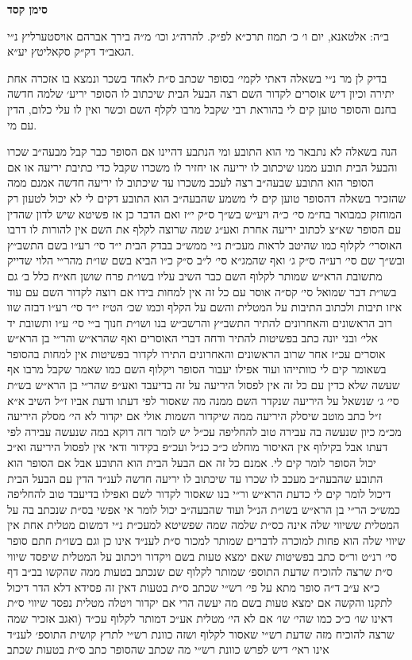 \documentclass[12pt, openany]{book}
\newcommand{\chapname}{}
\newcommand{\newchap}[1]{
	\addcontentsline{toc}{chapter}{#1}
	\renewcommand{\chapname}{#1}
		\begin{center}
			\textbf{%
\fontsize{16pt}{16pt}\selectfont
				#1}
		\end{center}
}
\begin{document}
\newchap{סימן קסד}
\begin{multicols}{2}
ב״ה: אלטאנא, יום ו׳ כ׳ תמוז תרכ״א לפ״ק. להרה״ג וכו׳ מ״ה בירך אברהם אויסטערליץ נ״י הגאב״ד דק״ק סקאליטץ יע״א.\\\vspace{0pt}

בדיק לן מר נ״י בשאלה דאתי לקמי׳ בסופר שכתב ס״ת לאחד בשכר ונמצא בו אזכרה אחת יתירה וכיון דיש אוסרים לקדור השם רצה הבעל הבית שיכתוב לו הסופר יריע׳ שלמה חדשה בחנם והסופר טוען קים לי בהוראת רבי שקבל מרבו לקלף השם וכשר ואין לו עלי כלום, הדין עם מי.\\\vspace{0pt}

הנה בשאלה לא נתבאר מי הוא התובע ומי הנתבע דהיינו אם הסופר כבר קבל מבעה״ב שכרו והבעל הבית תובע ממנו שיכתוב לו יריעה או יחזיר לו משכרו שקבל כדי כתיבת יריעה או אם הסופר הוא התובע שבעה״ב רצה לעכב משכרו עד שיכתוב לו יריעה חדשה אמנם ממה שהזכיר בשאלה דהסופר טוען קים לי משמע שהבעה״ב הוא התובע דקים לי לא יכול לטעון רק המוחזק כמבואר בח״מ סי׳ כ״ה ויע״ש בש״ך ס״ק י״ז ואם הדבר כן אז פשיטא שיש לדון שהדין עם הסופר שא״צ לכתוב יריעה אחרת ואע״ג שמה שרוצה לקלף את השם אין להורות לו דרבו האוסרי׳ לקלוף כמו שהיטב לראות מעכ״ת נ״י ממש״כ בבדק הבית י״ד סי׳ רע״ו בשם התשב״ץ ובש״ך שם סי׳ רע״ה ס״ק ג׳ ואף שהמג״א סי׳ ל״ב ס״ק כ״ו הביא בשם שו״ת מהר״י הלוי שדייק מתשובת הרא״ש שמותר לקלוף השם כבר השיב עליו בשו״ת פרח שושן חא״ח כלל ב׳ גם בשו״ת דבר שמואל סי׳ קס״ה אוסר עם כל זה אין למחות בידו אם רוצה לקדור השם עם עוד איזו תיבות ולכתוב התיבות על המטלית והשם על הקלף וכמו שכ׳ הט״ז י״ד סי׳ רע״ו דבזה שוו רוב הראשונים והאחרונים להתיר התשב״ץ והרשב״ש בנו ושו״ת חנוך ב״י סי׳ ע״ו ותשובת יד אלי׳ ובני יונה כתב בפשיטות להתיר ודחה דברי האוסרים ואף שהרא״ש והר״י בן הרא״ש אוסרים עכ״ז אחר שרוב הראשונים והאחרונים התירו לקדור בפשיטות אין למחות בהסופר בשאומר קים לי כוותייהו ועוד אפילו יעבור הסופר ויקלוף השם כמו שאמר שקבל מרבו אף שעשה שלא כדין עם כל זה אין לפסול היריעה על זה בדיעבד ואע״פ שהר״י בן הרא״ש בש״ת סי׳ ג׳ שנשאל על היריעה שנקדר השם ממנה מה שאסור לפי דעתו ודעת אביו ז״ל השיב א״א ז״ל כתב מוטב שיסלק היריעה ממה שיקדור השמות אולי אם יקדור לא הי׳ מסלק היריעה מכ״מ כיון שנעשה בה עבירה טוב להחליפה עכ״ל יש לומר דזה דוקא במה שנעשה עבירה לפי דעתו אבל בקילוף אין האיסור מוחלט כ״כ כנ״ל ועכ״פ בקידור ודאי אין לפסול היריעה וא״כ יכול הסופר לומר קים לי. אמנם כל זה אם הבעל הבית הוא התובע אבל אם הסופר הוא התובע שהבעה״ב מעכב לו שכרו עד שיכתוב לו יריעה חדשה לענ״ד הדין עם הבעל הבית דיכול לומר קים לי כדעת הרא״ש ור״י בנו שאסור לקדור לשם ואפילו בדיעבד טוב להחליפה כמש״כ הר״י בן הרא״ש בשו״ת הנ״ל ועוד שהבעה״ב יכול לומר אי אפשי בס״ת שנכתב בה על המטלית ששיווי שלה אינה כס״ת שלמה שמה שפשיטא למעכ״ת נ״י דמשום מטלית אחת אין שיווי שלה הוא פחות למוכרה לדברים שמותר למכור ס״ת לענ״ד אינו כן וגם בשו״ת חתם סופר סי׳ רנ״ט ור״ס כתב בפשיטות שאם ימצא טעות בשם ויקדור ויכתוב על המטלית שיפסד שיווי ס״ת שרצה להוכיח שדעת התוספ׳ שמותר לקלוף שם שנכתב בטעות ממה שהקשו בב״ב דף כ״א ע״ב ד״ה סופר מתא על פי׳ רש״י שכתב ס״ת בטעות דאין זה פסידא דלא הדר דיכול לתקנו והקשה אם ימצא טעות בשם מה יעשה הרי אם יקדור ויטלה מטלית נפסד שיווי ס״ת דאינו שו׳ כ״כ כמו שהי׳ שו׳ אם לא הי׳ מטלית אע״כ דמותר לקלוף עכ״ד (ואגב אזכיר שמה שרצה להוכיח מזה שדעת רש״י שאסור לקלוף ושזה כוונת רש״י לתרץ קושית התוספ׳ לענ״ד אינו ראי׳ דיש לפרש כוונת רש״י מה שכתב שהסופר כתב ס״ת בטעות שכתב 
\end{multicols}
\end{document}
